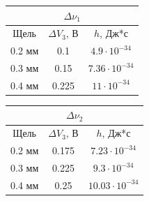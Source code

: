 	
	
  \begin{table}[H]
	\centering
	\begin{tabular}{|c|c|c|}
	\hline
	\multicolumn{3}{|c|}{$\Delta \nu_1$} \\ \hline
	Щель & $\Delta V_3$, В & $h$, Дж*с \\ \hline
	0.2 мм & 0.1 & $4.9 \cdot 10^{-34}$ \\ \hline
	0.3 мм & 0.15 & $7.36 \cdot 10^{-34}$ \\ \hline
	0.4 мм & 0.225 & $11\cdot 10^{-34}$ \\ \hline
	\end{tabular}
	\quad
	  \begin{tabular}{|c|c|c|}
	  \hline
	  \multicolumn{3}{|c|}{$\Delta \nu_2$} \\ \hline
	  Щель & $\Delta V_3$, В & $h$, Дж*с \\ \hline
	  0.2 мм & 0.175 & $7.23\cdot 10^{-34}$ \\ \hline
	  0.3 мм & 0.225 & $9.3 \cdot 10^{-34}$ \\ \hline
	  0.4 мм & 0.25 & $10.03 \cdot 10^{-34}$ \\ \hline
	  \end{tabular}
  \end{table}










